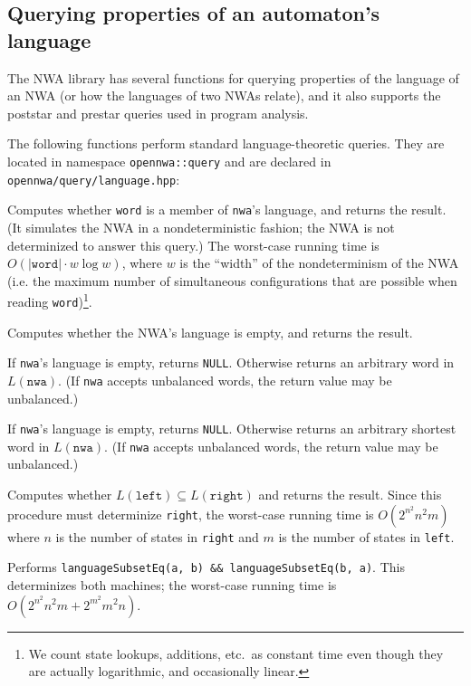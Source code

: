 \subsection{Querying properties of an automaton's language}
\label{Se:query-language}

The NWA library has several functions for querying
properties of the language of an NWA (or how the languages of two NWAs
relate), and it also supports
the poststar and prestar queries used in program analysis.

The following functions perform standard language-theoretic queries. They are
located in namespace \texttt{opennwa::query} and are declared in
\texttt{opennwa/query/language.hpp}:

\begin{functionlist}
    Computes whether \texttt{word} is a member of
    \texttt{nwa}'s language, and returns the result. (It simulates the
    NWA in a nondeterministic fashion; the NWA is not determinized to answer
    this query.) The worst-case running time is
    $O(|\texttt{word}|\cdot w\log w)$, where $w$ is the ``width'' of
    the nondeterminism of the NWA (i.e. the maximum number of
    simultaneous configurations that are possible when reading \texttt{word})\footnote{We count
      state lookups, additions, etc.\ as constant time even though they are
      actually logarithmic, and occasionally linear.}.
    
    Computes
    whether the NWA's language is empty, and returns the result.

    If \texttt{nwa}'s language is empty, returns \texttt{NULL}. Otherwise
    returns an arbitrary word in $L(\texttt{nwa})$. (If \texttt{nwa} accepts
    unbalanced words, the return value may be unbalanced.)

    If \texttt{nwa}'s language is empty, returns \texttt{NULL}. Otherwise
    returns an arbitrary shortest word in $L(\texttt{nwa})$. (If \texttt{nwa} accepts
    unbalanced words, the return value may be unbalanced.)

    Computes whether $L(\texttt{left}) \subseteq L(\texttt{right})$
    and returns the result. Since this procedure must determinize \texttt{right},
    the worst-case running time is $O(2^{n^2}n^2m)$ where $n$ is the number of
    states in \texttt{right} and $m$ is the number of states in \texttt{left}.

    Performs \texttt{languageSubsetEq(a, b) \&\&
    languageSubsetEq(b, a)}. This determinizes both machines; the
    worst-case running time is $O(2^{n^2}n^2m + 2^{m^2}m^2n)$.
\end{functionlist}

